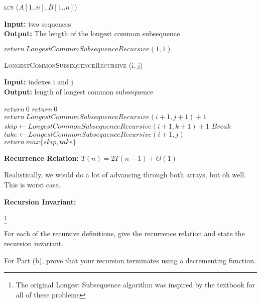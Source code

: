 \documentclass{article}
\begin{document}
\begin{algorithm} \caption{\textsc{lcs} ($A[1..n], B[1..n]$)}\label{alg:seb}
    {\bf Input:} two sequences\\
    {\bf Output:} The length of the longest common subsequence
    \begin{algorithmic}[1]
        \State$return\ LongestCommonSubsequenceRecursive(1, 1)$
    \end{algorithmic}
\end{algorithm}

\begin{algorithm} \caption{\textsc{LongestCommonSubsequenceRecursive} (i, j)}\label{alg:seb}
    {\bf Input:} indexes i and j\\
    {\bf Output:} length of longest common subsequence
    \begin{algorithmic}[1]
            \State$return\ 0$
            \State$return\ 0$
            \State$return\ LongestCommonSubsequenceRecursive(i+1, j+1) +1$
        \Else{}
                    \State$skip \gets LongestCommonSubsequenceRecursive(i+1, k+1) +1$
                    \State$Break$
                \EndIf{}
            \EndFor{}
            \State$take \gets LongestCommonSubsequenceRecursive(i+1, j)$
            \State$return\ max\{skip, take\}$
        \EndIf{}
    \end{algorithmic}
\end{algorithm}

{\bf Recurrence Relation: } $T(n) = 2T(n-1) + \Theta(1)$

Realistically, we would do a lot of advancing through both arrays, but oh well. This is worst case.

{\bf Recursion Invariant:}

\footnote{The original Longest Subsequence algorithm was inspired by the textbook for all of these problems}

\todo{}




For each of the recursive definitions, give the recurrence
relation and state the recursion invariant.

For Part (b), prove that your recursion terminates
using a decrementing function.
\end{document}
